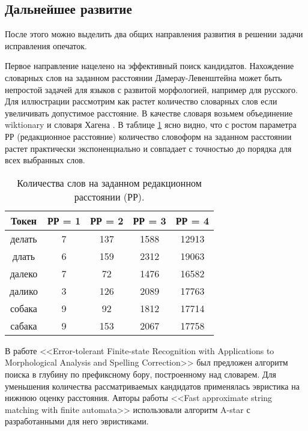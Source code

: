 \subsection{Дальнейшее развитие}

После этого можно выделить два общих направления развития в решении задачи исправления опечаток. 

Первое направление нацелено на эффективный поиск кандидатов. Нахождение словарных слов на заданном расстоянии Дамерау-Левенштейна может быть непростой задачей для языков с развитой морфологией, например для русского. Для иллюстрации рассмотрим как растет количество словарных слов если увеличивать допустимое расстояние. В качестве словаря возьмем объединение wiktionary \cite{Wiktionary} и словаря Хагена \cite{Hagen}. В таблице \ref{table:distances_examples} ясно видно, что с ростом параметра РР (редакционное расстояние) количество словоформ на заданном расстоянии растет практически экспоненциально и совпадает с точностью до порядка для всех выбранных слов.

\begin{table}[h]
	\begin{center}
		\caption{Количества слов на заданном редакционном расстоянии (РР).}
		\label{table:distances_examples}
		\begin{tabular}{|c|c|c|c|c|}
			\hline
			\textbf{Токен} & \textbf{РР = 1}  & \textbf{РР = 2} & \textbf{РР = 3} & \textbf{РР = 4}  \\
			\hline
			делать & 7  & 137 & 1588 & 12913  \\
			длать & 6  & 159 & 2312 & 19063  \\
			далеко & 7  & 72 & 1476 & 16582 \\
			далико & 3  & 126 & 2089 & 17763 \\
			собака & 9  & 92 & 1812 & 17714 \\
			сабака & 9  & 153 & 2067 & 17758 \\
			\hline
		\end{tabular}
	\end{center}
\end{table}

В работе <<Error-tolerant Finite-state Recognition with Applications to Morphological Analysis and Spelling Correction>> \cite{Oflazer1996} был предложен алгоритм поиска в глубину по префиксному бору, построенному над словарем. Для уменьшения количества рассматриваемых кандидатов применялась эвристика на нижнюю оценку расстояния.  Авторы работы <<Fast approximate string matching with finite automata>> \cite{Hulden2009} использовали алгоритм A-star \cite{Hart1968} с разработанными для него эвристиками.

